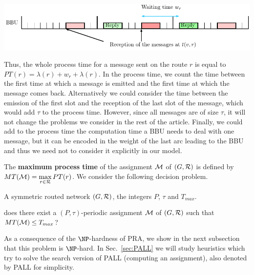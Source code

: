 \documentclass[a4paper,10pt]{article}
\begin{document}
{       \begin{center}
      \includegraphics[width=\textwidth]{BBU.pdf}
      \end{center}
     
    
      Thus, the whole process time for a message sent on the route $r$ is equal to
      $PT(r)=\lambda(r)+ w_r+\lambda(r)$.      
      In the process time, we count the time between the first time at which a message is emitted and the first time at which the message comes back. Alternatively we could consider the time between the emission of the first slot and the reception of the last slot of the message, which would add $\tau$ to the process time.
      However, since all messages are of size $\tau$, it will not change the problems we consider in the rest of the article.
      Finally, we could add to the process time the computation time a BBU needs to deal with one message, but it can be encoded  in the weight of the last arc leading to the BBU and thus we need not to consider it explicitly in our model.
      
      
    The {\bf maximum process time} of the assignment ${\cal M}$ of $(G,{\cal R})$ is defined by $MT({\cal M})=\max\limits_{r \in {\cal R}} PT(r)$. We consider the following decision problem.


        A symmetric routed network $(G,{\cal R})$, the integers $P$, $\tau$ and $T_{max}$.

       does there exist a $(P,\tau)$-periodic assignment ${\cal M}$ of $(G,{\cal R})$ such that $MT({\cal M}) \leq T_{max}$?

      As a consequence of the $\NP$-hardness of PRA, we show in the next subsection that this problem is $\NP$-hard. 
      In Sec.~\ref{sec:PALL} we will study heuristics which try to solve the search version of PALL (computing an assignment), also denoted by PALL for simplicity.

}
\end{document}
